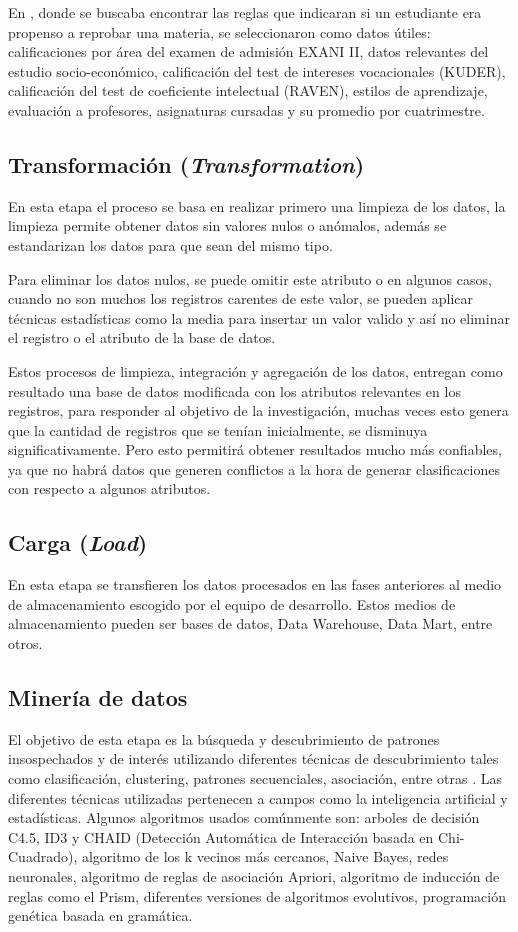 En \cite{key-140}, donde se buscaba encontrar las reglas que indicaran si un estudiante era propenso a reprobar una materia, se seleccionaron como datos útiles: calificaciones por área del examen de admisión EXANI II, datos relevantes del estudio socio-económico, calificación del test de intereses vocacionales (KUDER), calificación del test de coeficiente intelectual (RAVEN), estilos de aprendizaje, evaluación a profesores, asignaturas cursadas y su promedio por cuatrimestre.
\subsection{Transformación (\emph{Transformation}) \cite{key-50,key-100}}
En esta etapa el proceso se basa en realizar primero una limpieza de los datos, la limpieza permite obtener datos sin valores nulos o anómalos, además se estandarizan los datos para que sean del mismo tipo. 

Para eliminar los datos nulos, se puede omitir este atributo o en algunos casos, cuando no son muchos los registros carentes de este valor, se pueden aplicar técnicas estadísticas como la media para insertar un valor valido y así no eliminar el registro o el atributo de la base de datos.

Estos procesos de limpieza, integración y agregación de los datos, entregan como resultado una base de datos modificada con los atributos relevantes en los registros, para responder al objetivo de la investigación, muchas veces esto genera que la cantidad de registros que se tenían inicialmente, se disminuya significativamente. Pero esto permitirá obtener resultados mucho más confiables, ya que no habrá datos que generen conflictos a la hora de generar clasificaciones con respecto a algunos atributos.
\subsection{Carga (\emph{Load}) \cite{key-50,key-100}}
En esta etapa se transfieren los datos procesados en las fases anteriores al medio de almacenamiento escogido por el equipo de desarrollo. Estos medios de almacenamiento pueden ser bases de datos, Data Warehouse, Data Mart, entre otros.
\subsection{Minería de datos \cite{key-50,key-100}}
El objetivo de esta etapa es la búsqueda y descubrimiento de patrones insospechados y de interés utilizando diferentes técnicas de descubrimiento tales como clasificación, clustering, patrones secuenciales, asociación, entre otras \cite{key-100}. Las diferentes técnicas utilizadas pertenecen a campos como la inteligencia artificial y estadísticas. Algunos algoritmos usados comúnmente son: arboles de decisión C4.5, ID3 \cite{key-160} y CHAID (Detección Automática de Interacción basada en Chi-Cuadrado), algoritmo de los k vecinos más cercanos, Naive Bayes, redes neuronales, algoritmo de reglas de asociación Apriori, algoritmo de inducción de reglas como el Prism, diferentes versiones de algoritmos evolutivos, programación genética basada en gramática.
